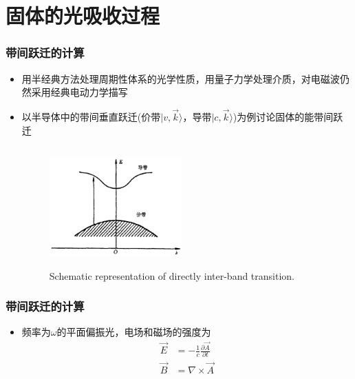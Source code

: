 \documentclass[cjk,slidestop,compress,mathserif,blue]{beamer}
\begin{document}
\section{固体的光吸收过程}
\frame
{
\frametitle{带间跃迁的计算}
\begin{itemize}
\setlength{\itemsep}{10pt}
	\item 用半经典方法处理周期性体系的光学性质，用量子力学处理介质，对电磁波仍然采用经典电动力学描写
	\item 以半导体中的带间垂直跃迁(价带$|v,\vec k\rangle$，导带$|c,\vec k\rangle$)为例讨论固体的能带间跃迁
\begin{figure}[h!]
\centering
\vspace*{-0.3in}
\includegraphics[height=1.8in,width=2.0in,viewport=0 0 1000 900,clip]{Figures/optic_dir.png}
\caption{\small \textrm{Schematic representation of directly inter-band transition.}}%
\label{Optic-dir}
\end{figure} 
\end{itemize}
}

\frame
{
	\frametitle{带间跃迁的计算}
\begin{itemize}
晶体中动量为$\vec p$的电子在电磁场(电磁场矢量势为$\vec A$)存在情况下，应用含时微扰理论，
\begin{displaymath}
	\hspace*{-20pt}
	H=\frac1{2m}[\vec p+\frac{e}c\mathbf{A}(\vec r,t)]^2+V(\vec r)=\left[ \frac{\vec p^2}{2m}+V(\vec r) \right]+\frac{e}{mc}\mathbf{A}\cdot\vec p+\frac{e^2}{2mc^2}\mathbf{A}^2
\end{displaymath}
其中电磁波
\begin{displaymath}
	\mathbf{A}(\vec r,t)=A_0\mathbf{e}\mathrm{e}^{\mathrm{i}(\vec q\cdot\vec r-\omega t)}+\mathrm{c.c}\quad\mathbf{e}\bot\vec q
\end{displaymath}
准确到$\vec A$的线性项(忽略$\vec A$的平方项)\textrm{Hamiltonian}为:
\begin{displaymath}
	H=\left[ \frac{\vec p^2}{2m}+V(\vec r) \right]+\frac{eA_0}{mc}\mathrm{e}^{\mathrm{i}(\vec q\cdot\vec r-\omega t)}\mathbf{e}\cdot\vec p+\frac{eA_0}{mc}\mathrm{e}^{-\mathrm{i}(\vec q\cdot\vec r-\omega t)}\mathbf{e}\cdot\vec p
\end{displaymath}
	\item 频率为$\omega$的平面偏振光，电场和磁场的强度为
\begin{displaymath}
\begin{aligned}
    \vec E&=-\frac1c\frac{\partial\vec A}{\partial t}\\
    \vec B&=\nabla\times\vec A
  \end{aligned}%
  \label{eq:optic-26}
\end{displaymath}
\end{itemize}
}
\end{document}
